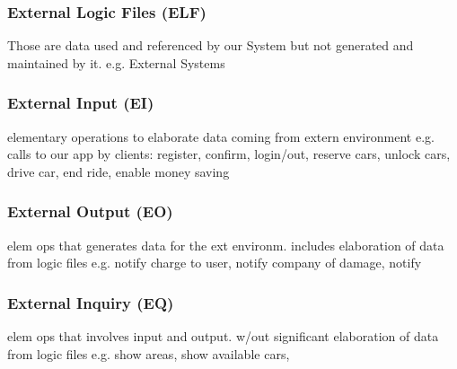 \subsubsection{External Logic Files (ELF)}	
Those are data used and referenced by our System but not generated and maintained by it.
	e.g. External Systems 

\subsubsection{External Input (EI)}
	elementary operations to elaborate data coming from extern environment
	e.g. calls to our app by clients: register, confirm, login/out, reserve cars, unlock cars, drive car, end ride, enable money saving

\subsubsection{External Output (EO)}
	elem ops that generates data for the ext environm. includes elaboration of data from logic files
	e.g. notify charge to user, notify company of damage, notify 

\subsubsection{External Inquiry (EQ)}
	elem ops that involves input and output. w/out significant elaboration of data from logic files
	e.g. show areas, show available cars, 